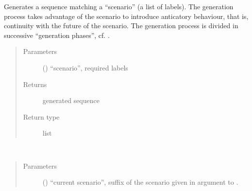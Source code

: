 \documentclass[letterpaper,10pt,english]{sphinxmanual}
\begin{document}
\begin{fulllineitems}
\begin{fulllineitems}
\label{\detokenize{index:Generator.Generator.handle_scenario_based_generation}}
Generates a sequence matching a “scenario” (a list of labels). The generation process takes advantage of the scenario to introduce anticatory behaviour, that is, continuity with the future of the scenario.
The generation process is divided in successive “generation phases”, cf. {\hyperref[\detokenize{index:Generator.Generator.handle_scenario_based_generation_one_phase}]{}}.
\begin{quote}\begin{description}
\item[{Parameters}] \leavevmode
{} () \textendash{} “scenario”, required labels

\item[{Returns}] \leavevmode
generated sequence

\item[{Return type}] \leavevmode
list

\end{description}\end{quote}

\end{fulllineitems}


\begin{fulllineitems}
\label{\detokenize{index:Generator.Generator.handle_scenario_based_generation_one_phase}}~\begin{quote}\begin{description}
\item[{Parameters}] \leavevmode
{} () \textendash{} “current scenario”, suffix of the scenario given in argument to {\hyperref[\detokenize{index:Generator.Generator.handle_scenario_based_generation}]{}}.


\end{description}
\end{quote}
\end{fulllineitems}
\end{fulllineitems}
\end{document}
